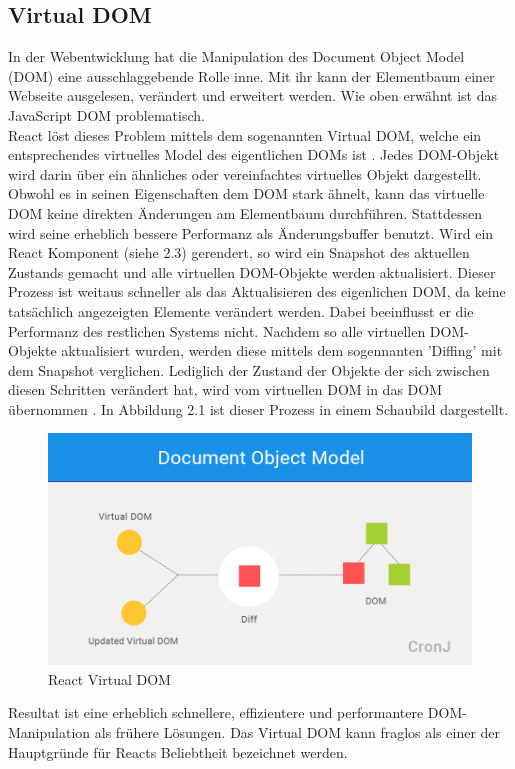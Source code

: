 \subsection{Virtual DOM}
In der Webentwicklung hat die Manipulation des Document Object Model (DOM) eine ausschlaggebende Rolle inne. Mit ihr kann der Elementbaum einer Webseite ausgelesen, verändert und erweitert werden. Wie oben erwähnt ist das JavaScript DOM problematisch.\\
React löst dieses Problem mittels dem sogenannten Virtual DOM, welche ein entsprechendes virtuelles Model des eigentlichen DOMs ist \cite{4}. Jedes DOM-Objekt wird darin über ein ähnliches oder vereinfachtes virtuelles Objekt dargestellt. Obwohl es in seinen Eigenschaften dem DOM stark ähnelt, kann das virtuelle DOM keine direkten Änderungen am Elementbaum durchführen. Stattdessen wird seine erheblich bessere Performanz als Änderungsbuffer benutzt. Wird ein React Komponent (siehe 2.3) gerendert, so wird ein Snapshot des aktuellen Zustands gemacht und alle virtuellen DOM-Objekte werden aktualisiert. Dieser Prozess ist weitaus schneller als das Aktualisieren des eigenlichen DOM, da keine tatsächlich angezeigten Elemente verändert werden. Dabei beeinflusst er die Performanz des restlichen Systems nicht. Nachdem so alle virtuellen DOM-Objekte aktualisiert wurden, werden diese mittels dem sogennanten 'Diffing' mit dem Snapshot verglichen. Lediglich der Zustand der Objekte der sich zwischen diesen Schritten verändert hat, wird vom virtuellen DOM in das DOM übernommen \cite{3}. In Abbildung 2.1 ist dieser Prozess in einem Schaubild dargestellt.\\
\begin{figure}[H]
     \centerline{\includegraphics[width=14cm]{../Abbildungen/virtualDom.png}}
  \caption{React Virtual DOM \cite{Abb2.1}}
  \label{React Virtual DOM}
\end{figure}
\noindent Resultat ist eine erheblich schnellere, effizientere und performantere DOM-Manipulation als frühere Lösungen. Das Virtual DOM kann fraglos als einer der Hauptgründe für Reacts Beliebtheit bezeichnet werden.
